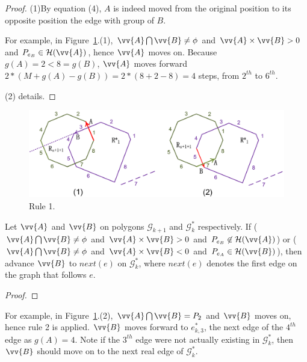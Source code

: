 \begin{proof}
(1)By equation (4), $A$ is indeed moved from the original position to its opposite position \wrt the edge with group of $B$.

For example, in Figure~\ref{fig:r-poly-rule1}.(1), $\vv{A} \bigcap \vv{B} \ne \phi$ and $\vv{A} \times \vv{B} > 0$ and $P_{e_B} \in \mathcal{H}(\vv{A})$, hence $\vv{A}$ moves on. Because $g(A)=2 < 8=g(B)$, $\vv{A}$ moves forward $2*(M+g(A) - g(B)) = 2*(8+2-8)= 4$ steps, \ie from $2^{th}$ to $6^{th}$.

(2) details.

\end{proof}

\begin{figure}[tb!]
\centering
\includegraphics[scale=0.88]{figures/Fig-r-poly-rule1.png}
\vspace{-1ex}
\caption{\small Rule 1.}
\vspace{-2ex}
\label{fig:r-poly-rule1}
\end{figure}




\begin{theorem}
\label{prop-rule2}
Let $\vv{A}$ and $\vv{B}$ on polygons $\mathcal{G}_{k+1}$ and $\mathcal{G}^*_k$ respectively.
If ($\vv{A} \bigcap \vv{B} \ne \phi$ and $\vv{A} \times \vv{B} > 0$ and $P_{e_B} \not \in \mathcal{H}(\vv{A})$) or ($\vv{A} \bigcap \vv{B} \ne \phi$ and $\vv{A} \times \vv{B} < 0$ and $P_{e_A} \in \mathcal{H}(\vv{B})$), then advance $\vv{B}$ to $next(e)$ on $\mathcal{G}^*_k$, where $next(e)$ denotes the first edge on the graph that follows $e$.
\end{theorem}

\begin{proof}

\end{proof}

For example, in Figure~\ref{fig:r-poly-rule1}.(2), $\vv{A} \bigcap \vv{B} = P_2$ and $\vv{B}$ moves on, hence rule 2 is applied. $\vv{B}$ moves forward to $e^*_{k, 3}$, \ie the next edge of the $4^{th}$ edge as $g(A) = 4$.
Note if the $3^{th}$ edge were not actually existing in $\mathcal{G}^*_k$, then $\vv{B}$ should move on to the next real edge of $\mathcal{G}^*_k$.




